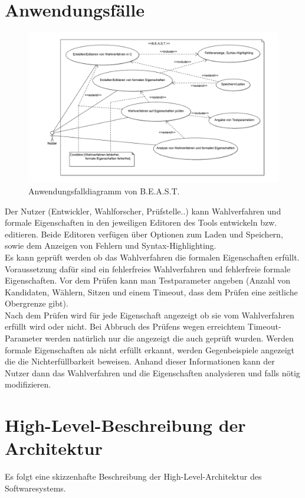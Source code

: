 \documentclass[a4paper]{scrreprt}
\begin{document}
\section{Anwendungsfälle}

\begin{figure}[H]
\hspace{-3cm}
\includegraphics[scale=0.12]{UseCaseDiagram.png}
\caption{Anwendungsfalldiagramm von B.E.A.S.T.}
\label{Packet-scetch}
\end{figure}

Der Nutzer (Entwickler, Wahlforscher, Prüfstelle..) kann Wahlverfahren und formale Eigenschaften in den jeweiligen Editoren des Tools entwickeln bzw. editieren.
Beide Editoren verfügen über Optionen zum Laden und Speichern, sowie dem Anzeigen von Fehlern und Syntax-Highlighting.\\
Es kann geprüft werden ob das Wahlverfahren die formalen Eigenschaften erfüllt. Voraussetzung dafür sind ein fehlerfreies Wahlverfahren und fehlerfreie formale Eigenschaften. Vor dem Prüfen kann man Testparameter angeben (Anzahl von Kandidaten, Wählern, Sitzen und einem Timeout, dass dem Prüfen eine zeitliche Obergrenze gibt).\\
Nach dem Prüfen wird für jede Eigenschaft angezeigt ob sie vom Wahlverfahren erfüllt wird oder nicht. Bei Abbruch des Prüfens wegen erreichtem Timeout-Parameter werden natürlich nur die angezeigt die auch geprüft wurden. Werden formale Eigenschaften als nicht erfüllt erkannt, werden Gegenbeispiele angezeigt die die Nichterfüllbarkeit beweisen. Anhand dieser Informationen kann der Nutzer dann das Wahlverfahren und die Eigenschaften analysieren und falls nötig modifizieren.

\section{High-Level-Beschreibung der Architektur}	
Es folgt eine skizzenhafte Beschreibung der High-Level-Architektur des Softwaresystems. 
\end{document}
